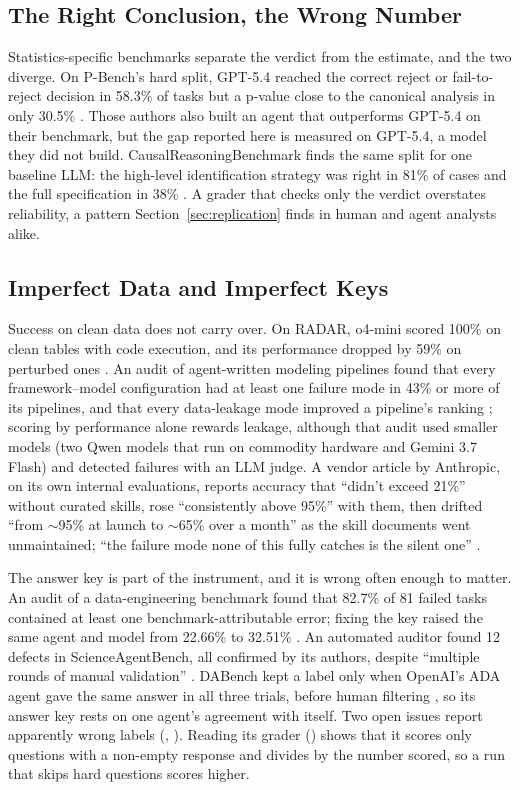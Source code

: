 \subsection{The Right Conclusion, the Wrong Number}

Statistics-specific benchmarks separate the verdict from the estimate, and the two diverge. On P-Bench's hard split, GPT-5.4 reached the correct reject or fail-to-reject decision in 58.3\% of tasks but a p-value close to the canonical analysis in only 30.5\% \citep{D21}. Those authors also built an agent that outperforms GPT-5.4 on their benchmark, but the gap reported here is measured on GPT-5.4, a model they did not build. CausalReasoningBenchmark finds the same split for one baseline LLM: the high-level identification strategy was right in 81\% of cases and the full specification in 38\% \citep{D20}. A grader that checks only the verdict overstates reliability, a pattern Section~\ref{sec:replication} finds in human and agent analysts alike.

\subsection{Imperfect Data and Imperfect Keys}

Success on clean data does not carry over. On RADAR, o4-mini scored 100\% on clean tables with code execution, and its performance dropped by 59\% on perturbed ones \citep{D17}. An audit of agent-written modeling pipelines found that every framework--model configuration had at least one failure mode in 43\% or more of its pipelines, and that every data-leakage mode improved a pipeline's ranking \citep{D23}; scoring by performance alone rewards leakage, although that audit used smaller models (two Qwen models that run on commodity hardware and Gemini 3.7 Flash) and detected failures with an LLM judge. A vendor article by Anthropic, on its own internal evaluations, reports accuracy that ``didn't exceed 21\%'' without curated skills, rose ``consistently above 95\%'' with them, then drifted ``from ${\sim}$95\% at launch to ${\sim}$65\% over a month'' as the skill documents went unmaintained; ``the failure mode none of this fully catches is the silent one'' \citep{D26}.

The answer key is part of the instrument, and it is wrong often enough to matter. An audit of a data-engineering benchmark found that 82.7\% of 81 failed tasks contained at least one benchmark-attributable error; fixing the key raised the same agent and model from 22.66\% to 32.51\% \citep{D13}. An automated auditor found 12 defects in ScienceAgentBench, all confirmed by its authors, despite ``multiple rounds of manual validation'' \citep{D15}. DABench kept a label only when OpenAI's ADA agent gave the same answer in all three trials, before human filtering \citep{D1}, so its answer key rests on one agent's agreement with itself. Two open issues report apparently wrong labels (, ). Reading its grader () shows that it scores only questions with a non-empty response and divides by the number scored, so a run that skips hard questions scores higher.

